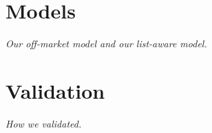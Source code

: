 \documentclass[11pt]{article}
\begin{document}
\section{Models}
\textit{Our off-market model and our list-aware model.}

\section{Validation}
\textit{How we validated.}
\end{document}
